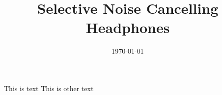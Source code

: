 \documentclass{ecsproject}
\title{Selective Noise Cancelling Headphones}
\date{\today}
\begin{document}
\maketitle

This is text \cite{EMHeadsets}
This is other text \cite{EMNoiseCancel}



\end{document}
